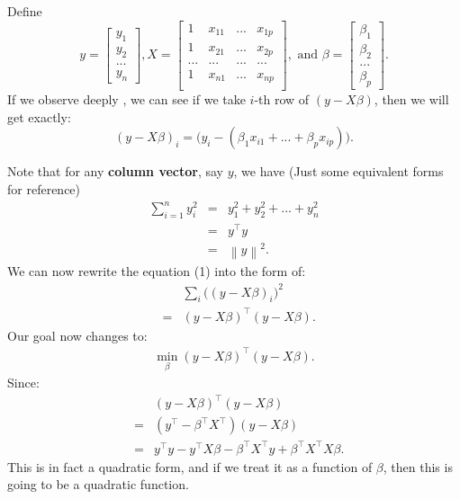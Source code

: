 \documentclass{article}
\theoremstyle{MyNonumberplain}
\theoremstyle{break}
\newcommand{\T}{^\intercal}
\newcommand{\bt}[1]{\beta_{#1}}
\theoremstyle{break}
\theoremstyle{break}
\theoremstyle{break}
\begin{document}
\begin{thmbox}
    \begin{prfbox}
        Define 
        $$y=
            \begin{bmatrix}
                y_1 \\
                y_2 \\
                ... \\
                y_n 
            \end{bmatrix}
            , X=
            \begin{bmatrix}
                1 & x_{11} &...& x_{1p}\\
                1 & x_{21} &...& x_{2p}\\
                ...&...&...&...\\
                1 & x_{n1} &...& x_{np}\\
            \end{bmatrix} 
            , \text{ and } \beta=
            \begin{bmatrix}
                \beta_1 \\
                \beta_2 \\
                ... \\
                \beta_p
            \end{bmatrix}.$$
    If we observe deeply , we can see if we take $i$-th row of $(y-X\beta)$, then we will get exactly: $$(y-X\beta)_i=\bigl(y_i-(\bt{1}x_{i1}+...+\bt{p}x_{ip})\bigr).$$

    Note that for any \textbf{column vector}, say $y$, we have (Just some equivalent forms for reference)
    \begin{eqnarray*}
        \sum_{i=1}^n y_i^2 &=& y_1^2+y_2^2+...+y_n^2 \\
                           &=& y\T y\\
                           &=& \left\lVert y\right\rVert^2.
    \end{eqnarray*}
    We can now rewrite the equation (1) into the form of:
    \begin{eqnarray*}
        & & \sum_i \bigl((y-X\beta)_i\bigr)^2\\
        &=& (y-X\beta)\T (y-X\beta).
    \end{eqnarray*}
    Our goal now changes to:
    \begin{eqnarray}
        \min_\beta (y-X\beta)\T (y-X\beta).
    \end{eqnarray}
    Since:
    \begin{eqnarray*}
        & &(y-X\beta)\T (y-X\beta) \\
        &=&(y\T-\beta\T X\T) (y-X\beta)\\
        &=&y\T y - y\T X\beta - \beta\T X\T y + \beta\T X\T X\beta.
    \end{eqnarray*}
    This is in fact a quadratic form, and if we treat it as a function of $\beta$, then this is going to be a quadratic function.


\end{prfbox}
\end{thmbox}
\end{document}
